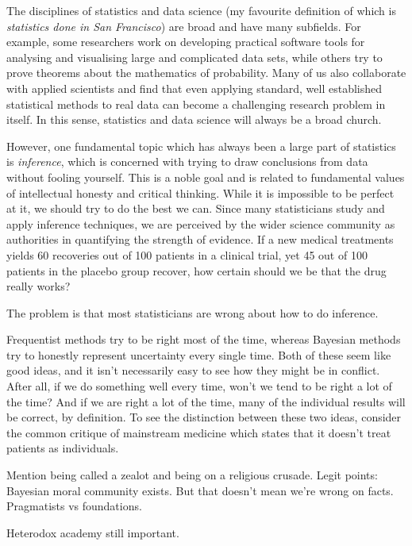 \documentclass[a4paper, 12pt]{article}
\begin{document}
The disciplines of statistics and data science
(my favourite definition of which is {\em statistics done in San Francisco})
are broad and have many subfields. For example, some researchers
work on developing practical software tools for analysing and visualising large and
complicated data sets, while others try to prove theorems about the mathematics
of probability. Many of us also collaborate with applied scientists and find
that even applying standard, well established statistical methods to
real data can become a challenging research problem in itself. In this sense,
statistics and data science will always be a broad church.

However, one fundamental topic which has always been a large part of
statistics is {\em inference}, which is concerned with trying to
draw conclusions from data without fooling yourself. This is a noble goal
and is related to fundamental values of intellectual honesty and critical
thinking. While
it is impossible to be perfect at it, we should try to do the best
we can. Since many statisticians study and apply inference techniques,
we are perceived by the wider science community as authorities
in quantifying the strength of evidence. If a new medical treatments yields 60
recoveries out of 100 patients in a clinical trial, yet 45 out of 100 patients
in the placebo group recover, how certain should we be that the drug really works?



The problem is that most statisticians are wrong about how to do inference.

Frequentist methods try to be right most of the time, whereas Bayesian methods
try to honestly represent uncertainty every single time. Both of these seem
like good ideas, and it isn't necessarily easy to see how they might be in
conflict. After all, if we do something well every time, won't we tend to be
right a lot of the time? And if we are right a lot of the time, many of the
individual results will be correct, by definition.
To see the distinction between these two ideas,
consider the common critique of mainstream medicine which states that it
doesn't treat patients as individuals.


Mention being called a zealot and being on a religious crusade.
Legit points: Bayesian moral community exists. But that doesn't mean we're
wrong on facts. Pragmatists vs foundations.

Heterodox academy still important.
\end{document}
